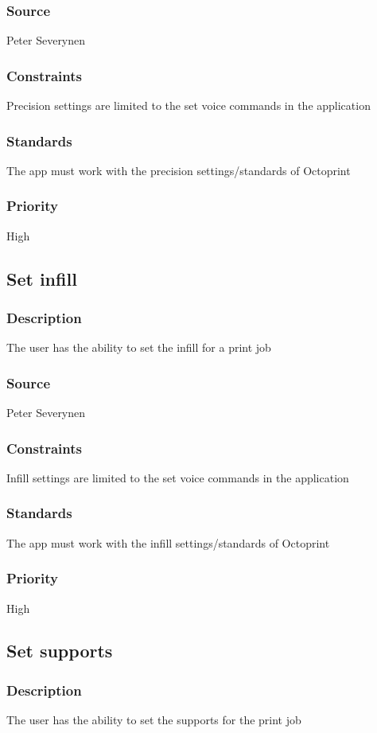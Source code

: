 \subsubsection{Source}
Peter Severynen
\subsubsection{Constraints}
Precision settings are limited to the set voice commands in the application
\subsubsection{Standards}
The app must work with the precision settings/standards of Octoprint
\subsubsection{Priority}
High
\subsection{Set infill}
\subsubsection{Description}
The user has the ability to set the infill for a print job
\subsubsection{Source}
Peter Severynen
\subsubsection{Constraints}
Infill settings are limited to the set voice commands in the application
\subsubsection{Standards}
The app must work with the infill settings/standards of Octoprint
\subsubsection{Priority}
High
\subsection{Set supports}
\subsubsection{Description}
The user has the ability to set the supports for the print job

